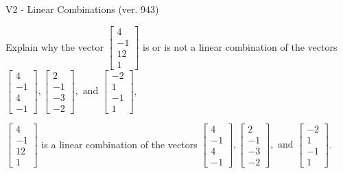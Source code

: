 \begin{exercise}
  \begin{exerciseTitle}V2 - Linear Combinations (ver. 943)\end{exerciseTitle}
  \begin{exerciseStatement}
    Explain why the vector \(\left[\begin{array}{c}
4 \\
-1 \\
12 \\
1
\end{array}\right]\)  is or is not a linear 
	combination of the vectors \(\left[\begin{array}{c}
4 \\
-1 \\
4 \\
-1
\end{array}\right] , \left[\begin{array}{c}
2 \\
-1 \\
-3 \\
-2
\end{array}\right] , \text{ and } \left[\begin{array}{c}
-2 \\
1 \\
-1 \\
1
\end{array}\right]\).
	


  \end{exerciseStatement}
  \begin{exerciseAnswer}
   \(\left[\begin{array}{c}
4 \\
-1 \\
12 \\
1
\end{array}\right]\) 
  	 is  
	a linear combination of the vectors \(\left[\begin{array}{c}
4 \\
-1 \\
4 \\
-1
\end{array}\right] , \left[\begin{array}{c}
2 \\
-1 \\
-3 \\
-2
\end{array}\right] , \text{ and } \left[\begin{array}{c}
-2 \\
1 \\
-1 \\
1
\end{array}\right]\).

	
  


  \end{exerciseAnswer}
\end{exercise}
